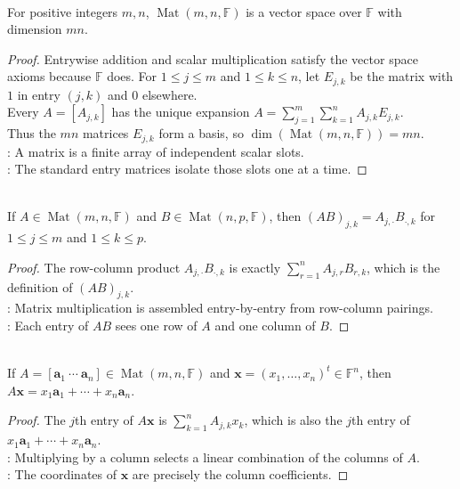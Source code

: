 \begin{proposition} \label{prop:matrix-spaces-are-vector-spaces} \\
For positive integers $m,n$, $\operatorname{Mat}(m,n,\mathbb{F})$ is a vector space over $\mathbb{F}$ with dimension $mn$.
\begin{proof}
Entrywise addition and scalar multiplication satisfy the vector space axioms because $\mathbb{F}$ does. For $1\leq j\leq m$ and $1\leq k\leq n$, let $E_{j,k}$ be the matrix with $1$ in entry $(j,k)$ and $0$ elsewhere.\\
Every $A=[A_{j,k}]$ has the unique expansion $A=\sum_{j=1}^m\sum\limits_{k=1}^n A_{j,k}E_{j,k}$.\\
Thus the $mn$ matrices $E_{j,k}$ form a basis, so $\dim(\operatorname{Mat}(m,n,\mathbb{F}))=mn$.\\
: A matrix is a finite array of independent scalar slots.\\
: The standard entry matrices isolate those slots one at a time.
\end{proof}
\end{proposition}

\begin{proposition} \label{prop:matrix-product-entry-row-column} \\
If $A\in\operatorname{Mat}(m,n,\mathbb{F})$ and $B\in\operatorname{Mat}(n,p,\mathbb{F})$, then $(AB)_{j,k}=A_{j,\cdot}B_{\cdot,k}$ for $1\leq j\leq m$ and $1\leq k\leq p$.
\begin{proof}
The row-column product $A_{j,\cdot}B_{\cdot,k}$ is exactly $\sum_{r=1}^n A_{j,r}B_{r,k}$, which is the definition of $(AB)_{j,k}$.\\
: Matrix multiplication is assembled entry-by-entry from row-column pairings.\\
: Each entry of $AB$ sees one row of $A$ and one column of $B$.
\end{proof}
\end{proposition}

\begin{proposition} \label{prop:matrix-vector-product-column-combination} \\
If $A=[\mathbf{a}_1\ \cdots\ \mathbf{a}_n]\in\operatorname{Mat}(m,n,\mathbb{F})$ and $\mathbf{x}=(x_1,\ldots,x_n)^t\in\mathbb{F}^n$, then $A\mathbf{x}=x_1\mathbf{a}_1+\cdots+x_n\mathbf{a}_n$.
\begin{proof}
The $j$th entry of $A\mathbf{x}$ is $\sum_{k=1}^n A_{j,k}x_k$, which is also the $j$th entry of $x_1\mathbf{a}_1+\cdots+x_n\mathbf{a}_n$.\\
: Multiplying by a column selects a linear combination of the columns of $A$.\\
: The coordinates of $\mathbf{x}$ are precisely the column coefficients.
\end{proof}
\end{proposition}


